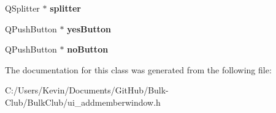 \begin{DoxyCompactItemize}
Q\+Splitter $\ast$ {\bfseries splitter}
\item 
\mbox{\label{class_ui___add_member_window_a72b05cdcee9ea3194db1dc5eef6e4be2}} 
Q\+Push\+Button $\ast$ {\bfseries yes\+Button}
\item 
\mbox{\label{class_ui___add_member_window_a5c9e073af8c0fac7f4c32ecb3286393e}} 
Q\+Push\+Button $\ast$ {\bfseries no\+Button}
\end{DoxyCompactItemize}


The documentation for this class was generated from the following file\+:\begin{DoxyCompactItemize}
\item 
C\+:/\+Users/\+Kevin/\+Documents/\+Git\+Hub/\+Bulk-\/\+Club/\+Bulk\+Club/ui\+\_\+addmemberwindow.\+h\end{DoxyCompactItemize}
